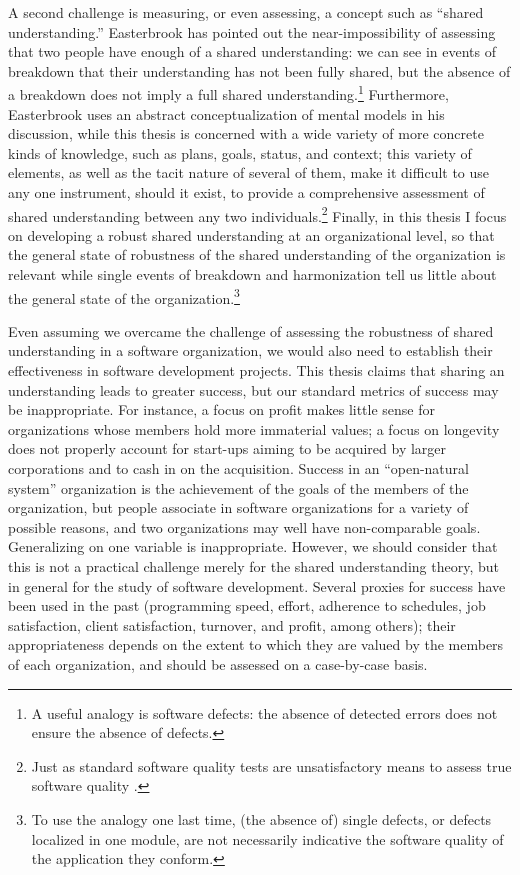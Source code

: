 A second challenge is measuring, or even assessing, a concept such as ``shared understanding.'' Easterbrook  has pointed out the near-impossibility of assessing that two people have enough of a shared understanding: we can see in events of breakdown that their understanding has not been fully shared, but the absence of a breakdown does not imply a full shared understanding.\footnote{A useful analogy is software defects: the absence of detected errors does not ensure the absence of defects.} Furthermore, Easterbrook uses an abstract conceptualization of mental models in his discussion, while this thesis is concerned with a wide variety of more concrete kinds of knowledge, such as plans, goals, status, and context; this variety of elements, as well as the tacit nature of several of them, make it difficult to use any one instrument, should it exist, to provide a comprehensive assessment of shared understanding between any two individuals.\footnote{Just as standard software quality tests are unsatisfactory means to assess true software quality \cite{Pipitone2010}.} Finally, in this thesis I focus on developing a robust shared understanding at an organizational level, so that the general state of robustness of the shared understanding of the organization is relevant while single events of breakdown and harmonization tell us little about the general state of the organization.\footnote{To use the analogy one last time, (the absence of) single defects, or defects localized in one module, are not necessarily indicative the software quality of the application they conform.}

Even assuming we overcame the challenge of assessing the robustness of shared understanding in a software organization, we would also need to establish their effectiveness in software development projects. This thesis claims that sharing an understanding leads to greater success, but our standard metrics of success may be inappropriate. For instance, a focus on profit makes little sense for organizations whose members hold more immaterial values; a focus on longevity does not properly account for start-ups aiming to be acquired by larger corporations and to cash in on the acquisition. Success in an ``open-natural system'' organization is the achievement of the goals of the members of the organization, but people associate in software organizations for a variety of possible reasons, and two organizations may well have non-comparable goals. Generalizing on one variable is inappropriate. However, we should consider that this is not a practical challenge merely for the shared understanding theory, but in general for the study of software development. Several proxies for success have been used in the past (programming speed, effort, adherence to schedules, job satisfaction, client satisfaction, turnover, and profit, among others); their appropriateness depends on the extent to which they are valued by the members of each organization, and should be assessed on a case-by-case basis.

